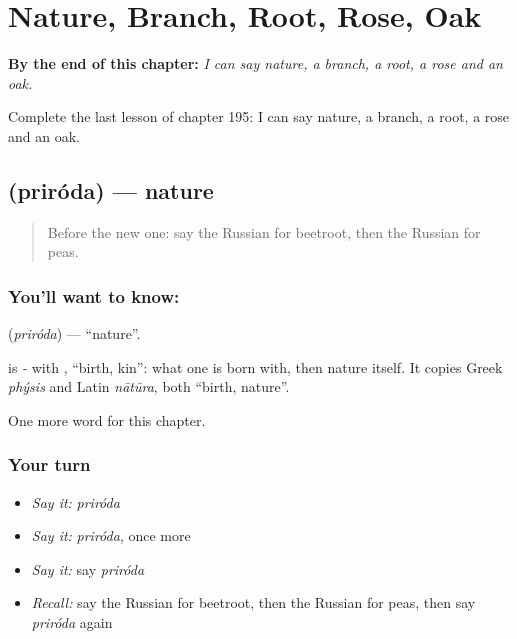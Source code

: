 
\chapter{Nature, Branch, Root, Rose, Oak}
\label{ch:ru-nature-branch-root-rose-oak}

\begin{chapteropening}
\textbf{By the end of this chapter:} \emph{I can say nature, a branch, a root, a rose and an oak.}

Complete the last lesson of chapter 195: I can say nature, a branch, a root, a rose and an oak.
\end{chapteropening}

\section[\texorpdfstring{\ru{природа} (priróda)}{природа (priróda)}]{ (priróda) — nature}

\label{lesson:RU-C195-priroda}



\begin{quote}
Before the new one: say the Russian for beetroot, then the Russian for peas.
\end{quote}

\subsection*{You'll want to know: }
\textbf{} (\emph{priróda}) — \textquotedblleft{}nature\textquotedblright{}.

\begin{cousinweb}
\textbf{} is \emph{-} with \emph{}, \textquotedblleft{}birth, kin\textquotedblright{}: what one is born with, then nature itself. It copies Greek \emph{phýsis} and Latin \emph{nātūra}, both \textquotedblleft{}birth, nature\textquotedblright{}.
\end{cousinweb}

\begin{grammarlens}[title={What you've built}]
One more word for this chapter.
\end{grammarlens}

\subsection*{Your turn}
\begin{itemize}
\raggedright
  \item \emph{Say it:} \emph{priróda}
  \item \emph{Say it:} \emph{priróda}, once more
  \item \emph{Say it:} say \emph{priróda}
  \item \emph{Recall:} say the Russian for beetroot, then the Russian for peas, then say \emph{priróda} again
\end{itemize}

